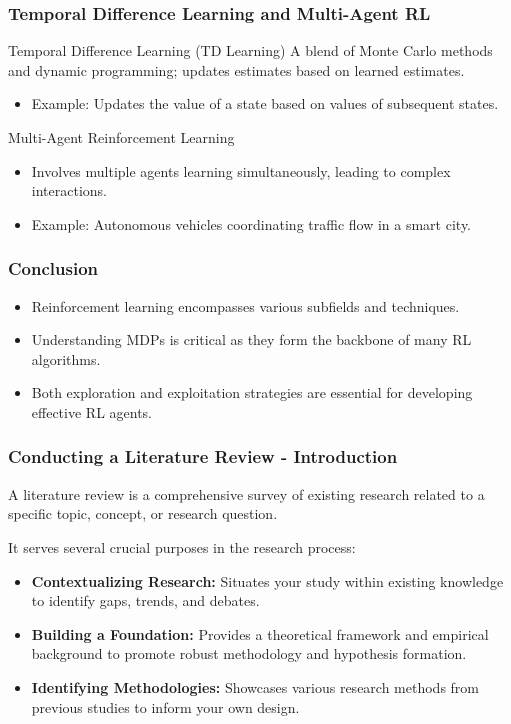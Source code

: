 \documentclass[aspectratio=169]{beamer}
\begin{document}
\begin{frame}[fragile]
    \frametitle{Temporal Difference Learning and Multi-Agent RL}
    \begin{block}{Temporal Difference Learning (TD Learning)}
        A blend of Monte Carlo methods and dynamic programming; updates estimates based on learned estimates.
        \begin{itemize}
            \item Example: Updates the value of a state based on values of subsequent states.
        \end{itemize}
    \end{block}
    \begin{block}{Multi-Agent Reinforcement Learning}
        \begin{itemize}
            \item Involves multiple agents learning simultaneously, leading to complex interactions.
            \item Example: Autonomous vehicles coordinating traffic flow in a smart city.
        \end{itemize}
    \end{block}
\end{frame}

\begin{frame}[fragile]
    \frametitle{Conclusion}
    \begin{itemize}
        \item Reinforcement learning encompasses various subfields and techniques.
        \item Understanding MDPs is critical as they form the backbone of many RL algorithms.
        \item Both exploration and exploitation strategies are essential for developing effective RL agents.
    \end{itemize}
\end{frame}

\begin{frame}[fragile]
    \frametitle{Conducting a Literature Review - Introduction}
    A literature review is a comprehensive survey of existing research related to a specific topic, concept, or research question.
    
    It serves several crucial purposes in the research process:
    
    \begin{itemize}
        \item \textbf{Contextualizing Research:} Situates your study within existing knowledge to identify gaps, trends, and debates.
        \item \textbf{Building a Foundation:} Provides a theoretical framework and empirical background to promote robust methodology and hypothesis formation.
        \item \textbf{Identifying Methodologies:} Showcases various research methods from previous studies to inform your own design.
    \end{itemize}
\end{frame}
\end{document}

